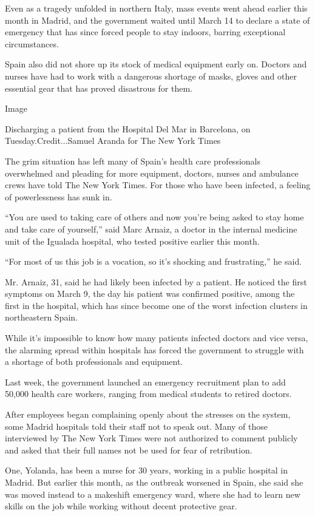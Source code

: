 Even as a tragedy unfolded in northern Italy, mass events went ahead
earlier this month in Madrid, and the government waited until March 14
to declare a state of emergency that has since forced people to stay
indoors, barring exceptional circumstances.

Spain also did not shore up its stock of medical equipment early on.
Doctors and nurses have had to work with a dangerous shortage of masks,
gloves and other essential gear that has proved disastrous for them.

Image

Discharging a patient from the Hospital Del Mar in Barcelona, on
Tuesday.Credit...Samuel Aranda for The New York Times

The grim situation has left many of Spain's health care professionals
overwhelmed and pleading for more equipment, doctors, nurses and
ambulance crews have told The New York Times. For those who have been
infected, a feeling of powerlessness has sunk in.

``You are used to taking care of others and now you're being asked to
stay home and take care of yourself,'' said Marc Arnaiz, a doctor in the
internal medicine unit of the Igualada hospital, who tested positive
earlier this month.

``For most of us this job is a vocation, so it's shocking and
frustrating,'' he said.

Mr. Arnaiz, 31, said he had likely been infected by a patient. He
noticed the first symptoms on March 9, the day his patient was confirmed
positive, among the first in the hospital, which has since become one of
the worst infection clusters in northeastern Spain.

While it's impossible to know how many patients infected doctors and
vice versa, the alarming spread within hospitals has forced the
government to struggle with a shortage of both professionals and
equipment.

Last week, the government launched an emergency recruitment plan to add
50,000 health care workers, ranging from medical students to retired
doctors.

After employees began complaining openly about the stresses on the
system, some Madrid hospitals told their staff not to speak out. Many of
those interviewed by The New York Times were not authorized to comment
publicly and asked that their full names not be used for fear of
retribution.

One, Yolanda, has been a nurse for 30 years, working in a public
hospital in Madrid. But earlier this month, as the outbreak worsened in
Spain, she said she was moved instead to a makeshift emergency ward,
where she had to learn new skills on the job while working without
decent protective gear.

